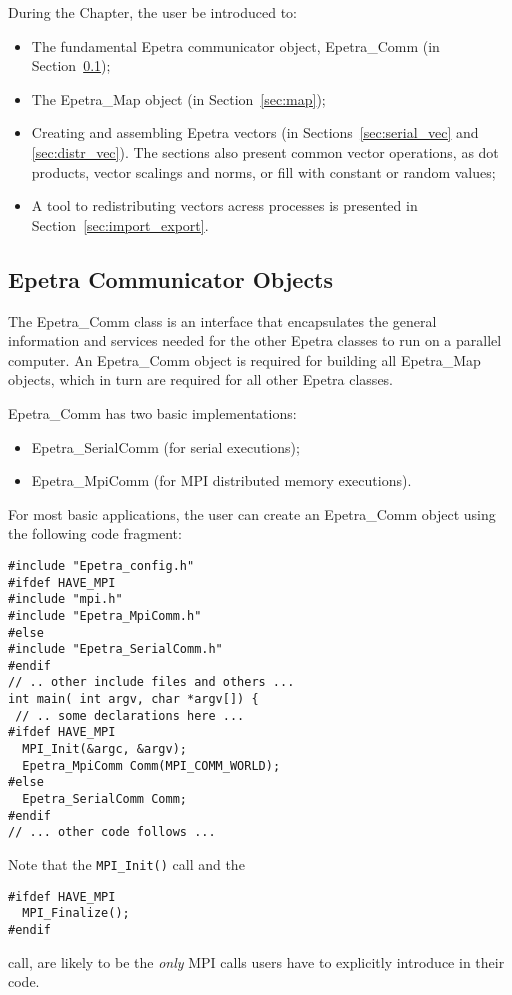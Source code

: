 \medskip

During the Chapter, the user be introduced to:
\begin{itemize}
\item The fundamental Epetra communicator object, Epetra\_Comm (in
  Section~\ref{sec:comm});
\item The Epetra\_Map object (in Section~\ref{sec:map});
\item Creating and assembling Epetra vectors (in
  Sections~\ref{sec:serial_vec} and \ref{sec:distr_vec}). The sections
  also present common vector operations, as dot products, vector
  scalings and norms, or fill with constant or random values;
\item A tool to redistributing vectors acress processes is presented in
  Section~\ref{sec:import_export}.
\end{itemize}


\subsection{Epetra Communicator Objects}
\label{sec:comm}

The Epetra\_Comm class is an interface that encapsulates the general
information and services needed for the other Epetra classes to run on a
parallel computer. An Epetra\_Comm object is required for building all
Epetra\_Map objects, which in turn are required for all other Epetra
classes.

Epetra\_Comm has two basic implementations:
\begin{itemize}
\item Epetra\_SerialComm (for serial executions);
\item Epetra\_MpiComm (for MPI distributed memory executions).
\end{itemize}

For most basic applications, the user can create an Epetra\_Comm object
using the following code fragment:
\begin{verbatim}
#include "Epetra_config.h"
#ifdef HAVE_MPI
#include "mpi.h"
#include "Epetra_MpiComm.h"
#else
#include "Epetra_SerialComm.h"
#endif
// .. other include files and others ...
int main( int argv, char *argv[]) {
 // .. some declarations here ...
#ifdef HAVE_MPI
  MPI_Init(&argc, &argv);
  Epetra_MpiComm Comm(MPI_COMM_WORLD);
#else
  Epetra_SerialComm Comm;
#endif
// ... other code follows ...
\end{verbatim}
Note that the \verb!MPI_Init()! call and the
\begin{verbatim}
#ifdef HAVE_MPI
  MPI_Finalize();
#endif
\end{verbatim}
call, are likely to be the {\em only} MPI calls users have to explicitly
introduce in their code.

